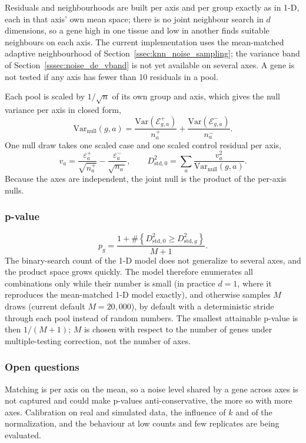             Residuals and neighbourhoods are built per axis and per group exactly as in 1-D, each in that axis' own mean space; there is no joint neighbour search in $d$ dimensions, so a gene high in one tissue and low in another finds suitable neighbours on each axis. The current implementation uses the mean-matched adaptive neighbourhood of Section~\ref{ssec:knn_noise_sampling}; the variance band of Section~\ref{sssec:noise_de_vband} is not yet available on several axes. A gene is not tested if any axis has fewer than 10 residuals in a pool.

            Each pool is scaled by $1/\sqrt{n}$ of its own group and axis, which gives the null variance per axis in closed form,
            \[
                \mathrm{Var}_{\mathrm{null}}(g,a) = \frac{\mathrm{Var}\!\left(\mathcal{E}^{+}_{g,a}\right)}{n^{+}_a} + \frac{\mathrm{Var}\!\left(\mathcal{E}^{-}_{g,a}\right)}{n^{-}_a}.
            \]
            One null draw takes one scaled case and one scaled control residual per axis,
            \[
                v_a = \frac{\varepsilon^{+}_{a}}{\sqrt{n^{+}_a}} - \frac{\varepsilon^{-}_{a}}{\sqrt{n^{-}_a}}, \qquad
                D^{2}_{\mathrm{std},0} = \sum_a \frac{v_a^2}{\mathrm{Var}_{\mathrm{null}}(g,a)}.
            \]
            Because the axes are independent, the joint null is the product of the per-axis nulls.

        \subsubsection{p-value}

            \[
                p_g = \frac{1 + \#\left\{D^{2}_{\mathrm{std},0} \ge D^{2}_{\mathrm{std},g}\right\}}{M + 1}.
            \]
            The binary-search count of the 1-D model does not generalize to several axes, and the product space grows quickly. The model therefore enumerates all combinations only while their number is small (in practice $d = 1$, where it reproduces the mean-matched 1-D model exactly), and otherwise samples $M$ draws (current default $M = 20{,}000$), by default with a deterministic stride through each pool instead of random numbers. The smallest attainable p-value is then $1/(M+1)$; $M$ is chosen with respect to the number of genes under multiple-testing correction, not the number of axes.

        \subsubsection{Open questions}

            Matching is per axis on the mean, so a noise level shared by a gene across axes is not captured and could make p-values anti-conservative, the more so with more axes. Calibration on real and simulated data, the influence of $k$ and of the normalization, and the behaviour at low counts and few replicates are being evaluated.
